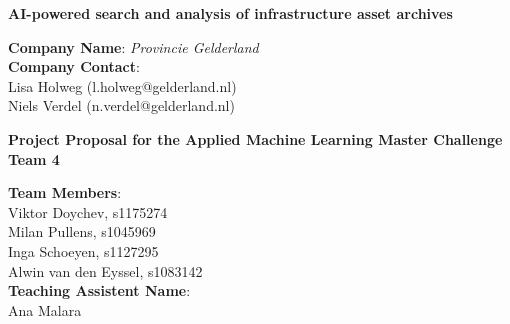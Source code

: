 \begin{titlepage}
    \begin{center}
        \vspace*{1cm}
        

        \Huge
        \textbf{AI-powered search and analysis of infrastructure asset archives}


        \vspace{2.9cm}
        \raggedright
        \Large
        \textbf{Company Name}:   \textit{Provincie Gelderland} \\
        \textbf{Company Contact}: \\
        Lisa Holweg (l.holweg@gelderland.nl) \\
        Niels Verdel (n.verdel@gelderland.nl)
        

        \vspace{3cm}
        \textbf{Project Proposal for the Applied Machine Learning Master Challenge} \\
        \vspace{0.5cm}
        \Large
        \textbf{Team 4}

        \vspace{1cm}
        \Large
        \textbf{Team Members}:\\
        Viktor Doychev, s1175274\\
        Milan Pullens, s1045969\\
        Inga Schoeyen, s1127295\\
        Alwin van den Eyssel, s1083142\\
        \vspace{0.5cm}
        \Large
        \textbf{Teaching Assistent Name}:\\
        Ana Malara
        
        

        
    \end{center}
\end{titlepage}